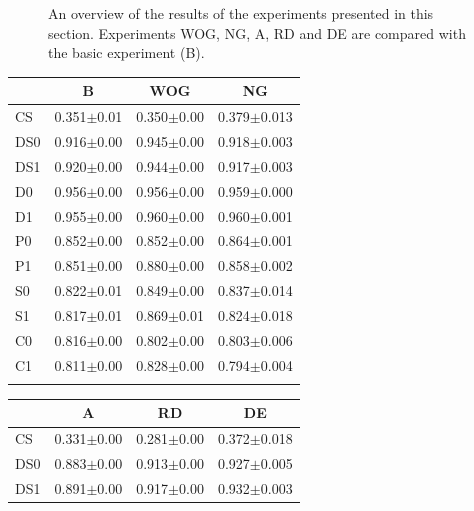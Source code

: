 \begin{figure}
\caption{An overview of the results of the experiments presented in this section. Experiments WOG, NG, A, RD and DE are compared with the basic experiment (B).}
\label{f:par:int}
\end{figure}

\begin{table}
\centering
\begin{tabular}{lccc}
\lsptoprule
         &B             &WOG           &NG\\\midrule
CS       &0.351$\pm$0.01&0.350$\pm$0.00&0.379$\pm$0.013\\%
DS0      &0.916$\pm$0.00&0.945$\pm$0.00&0.918$\pm$0.003\\%
DS1      &0.920$\pm$0.00&0.944$\pm$0.00&0.917$\pm$0.003\\%
D0       &0.956$\pm$0.00&0.956$\pm$0.00&0.959$\pm$0.000\\%
D1       &0.955$\pm$0.00&0.960$\pm$0.00&0.960$\pm$0.001\\%
P0       &0.852$\pm$0.00&0.852$\pm$0.00&0.864$\pm$0.001\\%
P1       &0.851$\pm$0.00&0.880$\pm$0.00&0.858$\pm$0.002\\%
S0       &0.822$\pm$0.01&0.849$\pm$0.00&0.837$\pm$0.014\\%
S1       &0.817$\pm$0.01&0.869$\pm$0.01&0.824$\pm$0.018\\%
C0       &0.816$\pm$0.00&0.802$\pm$0.00&0.803$\pm$0.006\\%
C1       &0.811$\pm$0.00&0.828$\pm$0.00&0.794$\pm$0.004\\%
\lspbottumrule
\end{tabular}
\begin{tabular}{lccc}
\lsptoprule
         &A             &RD            &DE\\\midrule
CS       &0.331$\pm$0.00&0.281$\pm$0.00&0.372$\pm$0.018\\%
DS0      &0.883$\pm$0.00&0.913$\pm$0.00&0.927$\pm$0.005\\%
DS1      &0.891$\pm$0.00&0.917$\pm$0.00&0.932$\pm$0.003\\%

\end{tabular}
\end{table}
